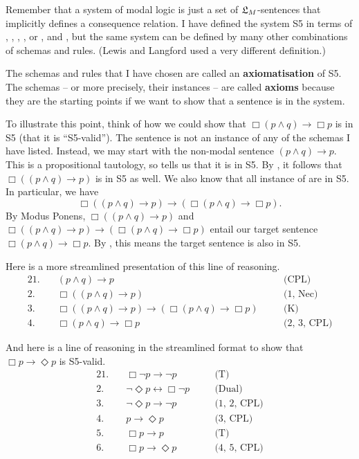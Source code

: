 Remember that a system of modal logic is just a set of $\mathfrak{L}_{M}$-sentences that
implicitly defines a consequence relation. I have defined the system S5 in terms
of , , , , or ,
 and , but the same system can be defined by many other
combinations of schemas and rules. (Lewis and Langford used a very different
definition.)

The schemas and rules that I have chosen are called an \textbf{axiomatisation}
of S5. The schemas -- or more precisely, their instances -- are called
\textbf{axioms} because they are the starting points if we want to show that a
sentence is in the system.


To illustrate this point, think of how we could show that
$\Box(p \land q) \to \Box p$ is in S5 (that it is ``S5-valid''). The sentence is
not an instance of any of the schemas I have listed. Instead, we may start with
the non-modal sentence $(p \land q) \to p$. This is a propositional tautology,
so  tells us that it is in S5. By , it follows that
$\Box((p \land q) \to p)$ is in S5 as well. We also know that all instance of
 are in S5. In particular, we have
\[
  \Box((p \land q) \to p) \to (\Box(p \land q) \to \Box p).
\]
By Modus Ponens, $\Box((p \land q) \to p)$ and
$\Box((p \land q) \to p) \to (\Box(p \land q) \to \Box p)$ entail our target
sentence $\Box(p \land q) \to \Box p$. By , this means the target
sentence is also in S5.

Here is a more streamlined presentation of this line of reasoning.
%
\begin{alignat*}{2}
  1.\quad& (p \land q) \to p &\quad& \text{(CPL)}\\
  2.\quad& \Box((p \land q) \to p) &\quad& \text{(1, Nec)}\\
  3.\quad& \Box((p \land q) \to p) \to( \Box(p \land q) \to \Box p) &\quad& \text{(K)}\\
  4.\quad& \Box(p \land q) \to \Box p &\quad& \text{(2, 3, CPL)}
\end{alignat*}

And here is a line of reasoning in the streamlined format to show that
$\Box p \to \Diamond p$ is S5-valid.
%
\begin{alignat*}{2}
  1.\quad& \Box \neg p \to \neg p &\quad& \text{(T)}\\
  2.\quad& \neg\Diamond p \leftrightarrow \Box \neg p &\quad& \text{(Dual)}\\
  3.\quad& \neg\Diamond p \to \neg p &\quad& \text{(1, 2, CPL)}\\
  4.\quad& p \to \Diamond p &\quad& \text{(3, CPL)}\\
  5.\quad& \Box p \to p &\quad& \text{(T)}\\
  6.\quad& \Box p \to \Diamond p &\quad& \text{(4, 5, CPL)}
\end{alignat*}

